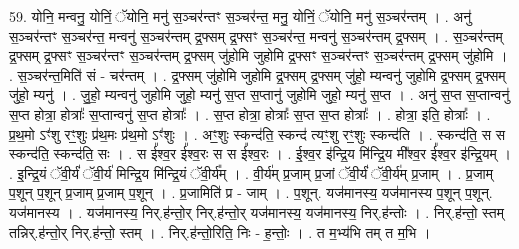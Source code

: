 \documentclass[17pt]{extarticle}
\begin{document}
59. योनि॒ मन्वनु॒ योनिं॒ ॅयोनि॒ मनु॑ स॒ञ्चर॑न्तꣳ स॒ञ्चर॑न्त॒ मनु॒ योनिं॒ ॅयोनि॒ मनु॑ स॒ञ्चर॑न्तम् । . अनु॑ स॒ञ्चर॑न्तꣳ स॒ञ्चर॑न्त॒ मन्वनु॑ स॒ञ्चर॑न्तम् द्र॒फ्सम् द्र॒फ्सꣳ स॒ञ्चर॑न्त॒ मन्वनु॑ स॒ञ्चर॑न्तम् द्र॒फ्सम् । . स॒ञ्चर॑न्तम् द्र॒फ्सम् द्र॒फ्सꣳ स॒ञ्चर॑न्तꣳ स॒ञ्चर॑न्तम् द्र॒फ्सम् जु॑होमि जुहोमि द्र॒फ्सꣳ स॒ञ्चर॑न्तꣳ स॒ञ्चर॑न्तम् द्र॒फ्सम् जु॑होमि । . स॒ञ्चर॑न्त॒मिति॑ सं - चर॑न्तम् । . द्र॒फ्सम् जु॑होमि जुहोमि द्र॒फ्सम् द्र॒फ्सम् जु॑हो॒ म्यन्वनु॑ जुहोमि द्र॒फ्सम् द्र॒फ्सम् जु॑हो॒ म्यनु॑ । . जु॒हो॒ म्यन्वनु॑ जुहोमि जुहो॒ म्यनु॑ स॒प्त स॒प्तानु॑ जुहोमि जुहो॒ म्यनु॑ स॒प्त । . अनु॑ स॒प्त स॒प्तान्वनु॑ स॒प्त होत्रा॒ होत्राः᳚ स॒प्तान्वनु॑ स॒प्त होत्राः᳚ । . स॒प्त होत्रा॒ होत्राः᳚ स॒प्त स॒प्त होत्राः᳚ । . होत्रा॒ इति॒ होत्राः᳚ । . प्र॒थ॒मो ऽꣳ॑शु रꣳ॒॒शुः प्र॑थ॒मः प्र॑थ॒मो ऽꣳ॑शुः । . अꣳ॒॒शुः स्कन्द॑ति॒ स्कन्द॑ त्यꣳ॒॒शु रꣳ॒॒शुः स्कन्द॑ति । . स्कन्द॑ति॒ स स स्कन्द॑ति॒ स्कन्द॑ति॒ सः । . स ई᳚श्व॒र ई᳚श्व॒रः स स ई᳚श्व॒रः । . ई॒श्व॒र इ॑न्द्रि॒य मि॑न्द्रि॒य मी᳚श्व॒र ई᳚श्व॒र इ॑न्द्रि॒यम् । . इ॒न्द्रि॒यं ॅवी॒र्यं॑ ॅवी॒र्य॑ मिन्द्रि॒य मि॑न्द्रि॒यं ॅवी॒र्य᳚म् । . वी॒र्य॑म् प्र॒जाम् प्र॒जां ॅवी॒र्यं॑ ॅवी॒र्य॑म् प्र॒जाम् । . प्र॒जाम् प॒शून् प॒शून् प्र॒जाम् प्र॒जाम् प॒शून् । . प्र॒जामिति॑ प्र - जाम् । . प॒शून्. यज॑मानस्य॒ यज॑मानस्य प॒शून् प॒शून्. यज॑मानस्य । . यज॑मानस्य॒ निर्.ह॑न्तो॒र् निर्.ह॑न्तो॒र् यज॑मानस्य॒ यज॑मानस्य॒ निर्.ह॑न्तोः । . निर्.ह॑न्तो॒ स्तम् तन्निर्.ह॑न्तो॒र् निर्.ह॑न्तो॒ स्तम् । . निर्.ह॑न्तो॒रिति॒ निः - ह॒न्तोः॒ । . त म॒भ्य॑भि तम् त म॒भि । \newline
\end{document}
